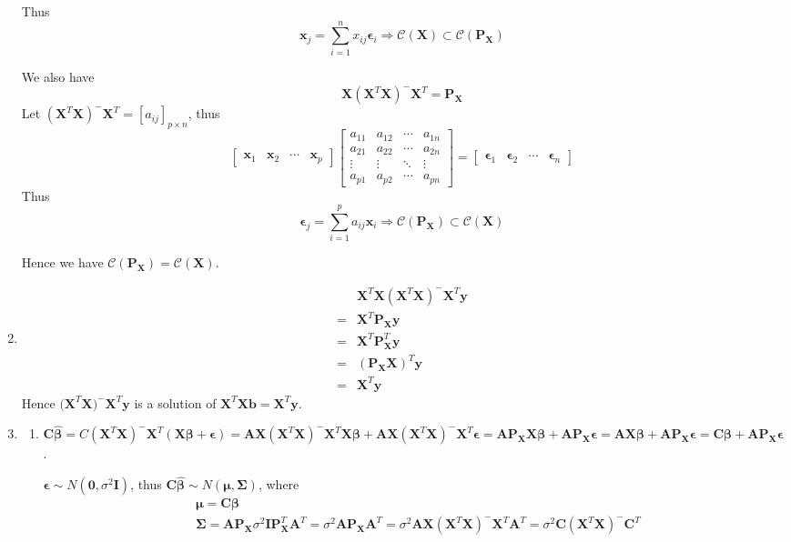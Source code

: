 \documentclass{article}
\begin{document}
\begin{enumerate}[leftmargin = 0 em, label = \arabic*., font = \bfseries]
	Thus 
	\[\bm x_{j} = \sum_{i = 1}^n x_{ij} \bm \epsilon_{i} \Rightarrow \mathcal{C}(\bm X) \subset \mathcal{C}(\bm P_{\bm X})\]

	We also have 
	\[\bm X (\bm X^T \bm X)^- \bm X^T = \bm P_{\bm X}\]
	Let $(\bm X^T \bm X)^- \bm X^T = [a_{ij}]_{p \times n}$, thus
	\[\begin{bmatrix}
		\bm x_1 & \bm x_2 & \cdots & \bm x_p
	\end{bmatrix}  \begin{bmatrix}
		a_{11} & a_{12} & \cdots & a_{1n}\\
		a_{21} & a_{22} & \cdots & a_{2n} \\
		\vdots & \vdots & \ddots & \vdots \\
		a_{p1} & a_{p2} & \cdots & a_{pn}
	\end{bmatrix} = \begin{bmatrix}
		\bm \epsilon_{1} & \bm \epsilon_{2} & \cdots & \bm \epsilon_{n}
	\end{bmatrix}\]
	Thus 
	\[\bm \epsilon_{j} = \sum_{i = 1}^p a_{ij} \bm x_{i} \Rightarrow \mathcal{C}(\bm P_{\bm X}) \subset \mathcal{C}(\bm X)\]

	Hence we have $\mathcal{C}(\bm P_{\bm X}) = \mathcal{C}(\bm X).$


	\item 
	\begin{align*}
	& \bm X^T \bm X (\bm X^T \bm X)^{-}\bm X^T\bm y \\
	 =& \bm X^T \bm P_{\bm X}\bm y \\
	 = &\bm X^T \bm P_{\bm X}^T \bm y\\
	 = &(\bm P_{\bm X} \bm X)^T \bm y\\
	 = &\bm X^T \bm y 
	\end{align*}
	Hence $\bm (\bm X^T \bm X)^{-} \bm X^T \bm y$ is a solution of $\bm X^T \bm X \bm b = \bm X^T \bm y$.


	\item 
	\begin{enumerate}
		\item 
		$\bm C \hat{\bm \beta} = C (\bm X^T \bm X)^- \bm X^T (\bm X \bm \beta + \bm \epsilon) = \bm A \bm X (\bm X^T \bm X)^- \bm X^T \bm X \bm \beta + \bm A \bm X (\bm X^T \bm X)^- \bm X^T \bm \epsilon = \bm A \bm P_{\bm X} \bm X \bm \beta + \bm A \bm P_{\bm X} \bm \epsilon = \bm A \bm X \bm \beta + \bm A \bm P_{\bm X} \bm \epsilon = \bm C \bm \beta + \bm A \bm P_{\bm X} \bm \epsilon$.

		$\bm \epsilon \sim N(\bm 0, \sigma^2 \bm I)$, thus $\bm C \hat{\bm \beta} \sim N(\bm \mu , \bm \Sigma)$, where
		\begin{align*}
		&\bm \mu = \bm C \bm \beta\\
		&\bm \Sigma = \bm A \bm P_{\bm X} \sigma^2 \bm I \bm P_{\bm X}^T \bm A^T = \sigma^2 \bm A \bm P_{\bm X}\bm A^T = \sigma^2 \bm A \bm X(\bm X^T \bm X)^- \bm X^T \bm A^T = \sigma^2 \bm C (\bm X^T \bm X)^- \bm C^T
		\end{align*}



\end{enumerate}
\end{enumerate}
\end{document}
